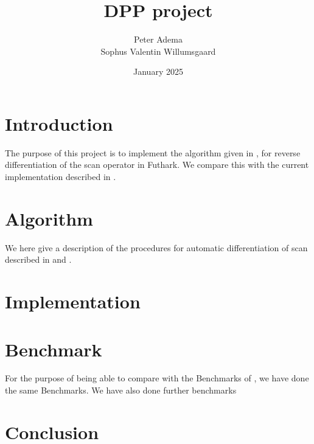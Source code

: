 \documentclass{article}
\title{DPP project}
\author{Peter Adema \\
Sophus Valentin Willumsgaard}
\date{January 2025}
\begin{document}
\maketitle

\section{Introduction}
The purpose of this project is to implement the algorithm given in \cite{PPAD}, for reverse
differentiation of the scan operator in Futhark.
We compare this with the current implementation described in \cite{Futhark}.
\section{Algorithm}
We here give a description of the procedures for automatic differentiation of
scan described in \cite{PPAD} and \cite{Futhark}.
\section{Implementation}
\section{Benchmark}
For the purpose of being able to compare with the Benchmarks of
\cite{Futhark}, we have done the same Benchmarks. We have also done further
benchmarks
\section{Conclusion}

\printbibliography
\end{document}
